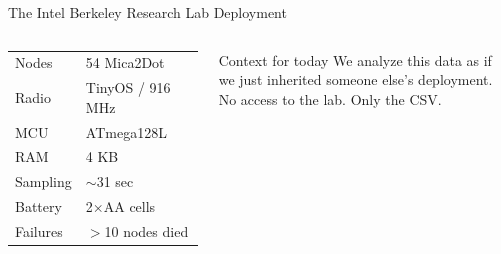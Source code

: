 \documentclass[aspectratio=169,11pt]{beamer}
\begin{document}
\begin{frame}[shrink=5]{The Intel Berkeley Research Lab Deployment}
\begin{columns}
{\begin{minipage}{0.9\textwidth}
            \vspace{0.1cm}
            \begin{tabular}{ll}
                Nodes      & 54 Mica2Dot \\
                Radio      & TinyOS / 916 MHz \\
                MCU        & ATmega128L \\
                RAM        & 4 KB \\
                Sampling   & $\sim$31 sec \\
                Battery    & 2$\times$AA cells \\
                Failures   & $>$10 nodes died \\
            \end{tabular}
            \vspace{0.1cm}
        \end{minipage}
        }

        \vspace{0.15cm}
        \begin{alertblock}{\small Context for today}
            \small
            We analyze this data as if we just inherited someone else's deployment. No access to the lab. Only the CSV.
        \end{alertblock}
    \end{columns}
\end{frame}
\end{document}

